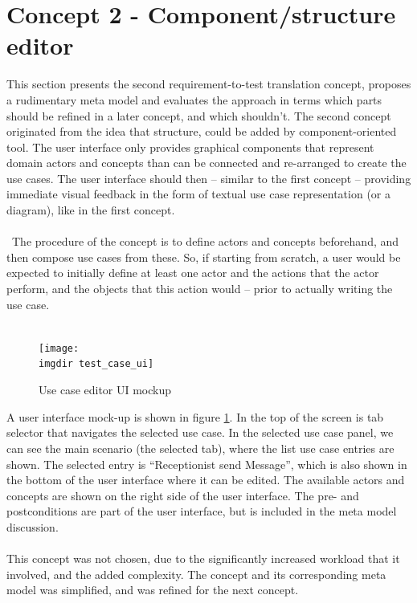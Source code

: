 \section{Concept 2 - Component/structure editor}
This section presents the second requirement-to-test translation concept, proposes a rudimentary meta model and evaluates the approach in terms which parts should be refined in a later concept, and which shouldn't.
The second concept originated from the idea that structure, could be added by component-oriented tool. The user interface only provides graphical components that represent domain actors and concepts than can be connected and re-arranged to create the use cases. The user interface should then -- similar to the first concept -- providing immediate visual feedback in the form of textual use case representation (or a diagram), like in the first concept.\\\\\
The procedure of the concept is to define actors and concepts beforehand, and then compose use cases from these. So, if starting from scratch, a user would be expected to initially define at least one actor and the actions that the actor perform, and the objects that this action would -- prior to actually writing the use case.\\\\
\begin{figure}[!htbp]
\texttt{[image: \\imgdir test\_case\_ui]}
\centering
\caption{Use case editor UI mockup}
\label{fig:use_case_editor_mockup}
\end{figure}A user interface mock-up is shown in figure \ref{fig:use_case_editor_mockup}. In the top of the screen is tab selector that navigates the selected use case. In the selected use case panel, we can see the main scenario (the selected tab), where the list use case entries are shown. The selected entry is ``Receptionist send Message'', which is also shown in the bottom of the user interface where it can be edited. The available actors and concepts are shown on the right side of the user interface. The pre- and postconditions are part of the user interface, but is included in the meta model discussion.\\\\
This concept was not chosen, due to the significantly increased workload that it involved, and the added complexity. The concept and its corresponding meta model was simplified, and was refined for the next concept.

